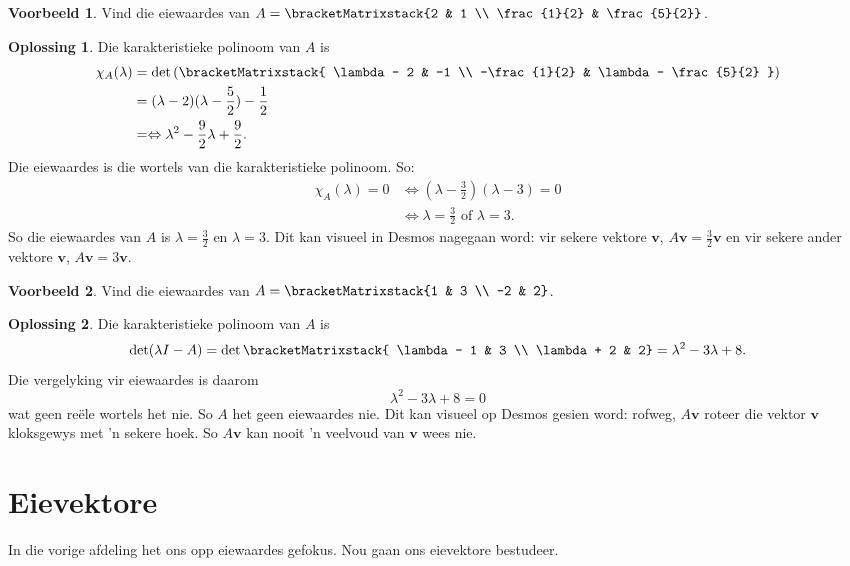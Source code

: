 \documentclass[a4paper,11pt]{book}
\theoremstyle{definition}
\newtheorem{example_environment}{Voorbeeld}[chapter]
\newtheorem*{solution}{Oplossing}
\newcommand{\ve}[1]{\mathbf{#1}}
\newcommand{\cmatrix}[1]{\bracketMatrixstack{#1}}
\newenvironment{example}
	{
		\begin{oframed}
		\begin{example_environment}
	}
	{
		\end{example_environment}
		\end{oframed}
	}
\begin{document}
\begin{example} \label{desmos_matrix} Vind die eiewaardes van $A = \cmatrix{2 & 1 \\ \frac{1}{2}
	& \frac{5}{2}}$.
	\begin{solution} 
		Die karakteristieke polinoom van $A$ is
		\begin{align*}
			\chi_A(\lambda) &= \det \left({\cmatrix{ \lambda - 2 & -1 \\
			-\frac{1}{2} & \lambda - \frac{5}{2} }} \right)  \\
			&= (\lambda - 2)(\lambda - \frac{5}{2}) - \frac{1}{2} \\
			&= \Leftrightarrow \lambda^2 - \frac{9}{2} \lambda +
			\frac{9}{2}.
		\end{align*}
		Die eiewaardes is die wortels van die karakteristieke polinoom. So:
		\begin{align*}
			\chi_A (\lambda) = 0 &\Leftrightarrow (\lambda -
			\frac{3}{2})(\lambda - 3) = 0 \\
			& \Leftrightarrow \lambda = \frac{3}{2} \text{ of } \lambda =
			3.
		\end{align*}
		So die eiewaardes van $A$ is $\lambda = \frac{3}{2}$ en $\lambda =
		3$. Dit kan visueel in Desmos nagegaan word: vir sekere vektore
		$\ve{v}$, $A \ve{v} = \frac{3}{2} \ve{v}$ en vir sekere ander
		vektore $\ve{v}$, $A \ve{v} = 3 \ve{v}$.
	\end{solution}
\end{example} 

\begin{example} Vind die eiewaardes van $A = \cmatrix{1 & 3 \\ -2 & 2}$.
	\begin{solution}
		Die karakteristieke polinoom van $A$ is 
		\[
			\det (\lambda I - A) = \det \cmatrix{ \lambda - 1 & 3 \\
			\lambda + 2 & 2} = \lambda^2 - 3\lambda + 8.
		\]
		Die vergelyking vir eiewaardes is daarom
		\[
			\lambda^2 - 3\lambda + 8 = 0
		\]
		wat geen re{\"e}le wortels het nie. So $A$ het geen eiewaardes nie.
		Dit kan visueel op Desmos gesien word: rofweg, $A\ve{v}$ roteer die
		vektor $\ve{v}$ kloksgewys met 'n sekere hoek. So $A \ve{v}$ kan
		nooit 'n veelvoud van $\ve{v}$ wees nie.
	\end{solution}
\end{example}

\section{Eievektore}\label{ACh4Sec2Eigenvectors}
In die vorige afdeling het ons opp eiewaardes gefokus.  Nou gaan ons
eievektore bestudeer.
\end{document}
